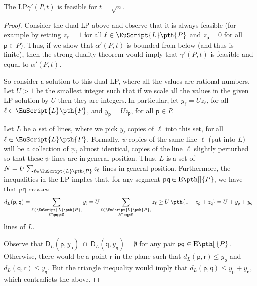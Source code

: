 \documentclass[12pt]{article}
\newcommand{\PntSet}{P}
\newcommand{\LinesX}[1]{\EuScript{L}\pth{#1}}
\newcommand{\pnt}{\mathsf{p}}
\newcommand{\pntA}{\mathsf{q}}
\newcommand{\pntB}{\mathsf{r}}
\newcommand{\lineA}{\ell}
\newcommand{\pairsX}[1]{\mathrm{E}\pth[]{#1}}
\newcommand{\Term}[1]{\textsf{#1}}
\newcommand{\LP}{\Term{L{}P}\xspace}
\newcommand{\dCr}[2]{d_{#1}(#2)}
\newcommand{\diskCr}[2]{\mathsf{D}_{#1}(#2)}
\newcommand{\LineSet}{L}
\begin{document}
\begin{lemma}
    The \LP $\gamma'(\PntSet, t)$ is feasible for $t = \sqrt{n}$.

\end{lemma}
\begin{proof}
    Consider the dual \LP above and observe that it is always feasible
    (for example by setting $z_\lineA =1$ for all $\lineA \in
    \LinesX{\PntSet}$ and $z_\pnt = 0$ for all $\pnt \in \PntSet$).
    Thus, if we show that $\alpha'(P,t)$ is bounded from below (and
    thus is finite), then the strong duality theorem would imply that
    $\gamma'(\PntSet,t)$ is feasible and equal to $\alpha'(P,t)$.

    So consider a solution to this dual \LP, where all the values are
    rational numbers. Let $U>1$ be the smallest integer such that if
    we scale all the values in the given \LP solution by $U$ then they are
    integers. In particular, let $y_\lineA =  U z_\lineA$, for all
    $\lineA \in \LinesX{\PntSet}$, and $y_\pnt = U z_\pnt$, for all
    $\pnt \in \PntSet$.

    Let $\LineSet$ be a set of lines, where we pick $y_\lineA$ copies
    of $\lineA$ into this set, for all $\lineA \in
    \LinesX{\PntSet}$. Formally, $\psi$ copies of the same line
    $\lineA$ (put into $\LineSet$) will be a collection of $\psi$,
    almost identical, copies of the line $\lineA$ slightly perturbed
    so that these $\psi$ lines are in general position.  Thus,
    $\LineSet$ is a set of $N = U \sum_{\lineA \in \LinesX{\PntSet}}
    z_\lineA$ lines in general position. Furthermore, the inequalities
    in the \LP implies that, for any segment $\pnt \pntA \in
    \pairsX{\PntSet}$, we have that $\pnt \pntA$ crosses
    \[
    \dCr{L}{\pnt, \pntA} =
    \sum_{\substack{\ell \in \LinesX{\PntSet},
          \\
          \ell \cap \pnt\pntA \ne \emptyset}} y_{\ell} 
    = 
    U \sum_{\substack{\ell \in \LinesX{\PntSet},
          \\
          \ell \cap \pnt\pntA \ne \emptyset}} z_{\ell} 
    \geq U \; \pth{1 + z_\pnt +
       z_\pntA} = U + y_\pnt + y_\pntA
    \]
    lines of $\LineSet$. 

    Observe that $\diskCr{\LineSet}{\pnt, y_\pnt} \;\cap\;
    \diskCr{\LineSet}{\pntA, y_\pntA} = \emptyset$ for any pair $\pnt
    \pntA \in \pairsX{\PntSet}$. Otherwise, there would be a point
    $\pntB$ in the plane such that $\dCr{L}{\pnt, \pntB} \leq y_\pnt$
    and $\dCr{L}{\pntA, \pntB} \leq y_\pntA$. But the triangle
    inequality would imply that $\dCr{L}{\pnt, \pntA} \leq y_\pnt +
    y_\pntA$, which contradicts the above.
      

\end{proof}
\end{document}
